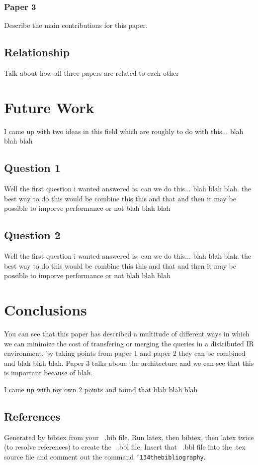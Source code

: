 \documentclass{acm_proc_article-sp}
\begin{document}
\subsubsection{Paper 3}
Describe the main contributions for this paper.

\subsection{Relationship}
Talk about how all three papers are related to each other

\section{Future Work}
I came up with two ideas in this field which are roughly to do with this... blah blah blah

\subsection{Question 1}
Well the first question i wanted answered is, can we do this... blah blah blah. the best way to do this would be combine this this and that and then it may be possible to imporve performance or not blah blah blah

\subsection{Question 2}
Well the first question i wanted answered is, can we do this... blah blah blah. the best way to do this would be combine this this and that and then it may be possible to imporve performance or not blah blah blah

\section{Conclusions}
You can see that this paper has described a multitude of different ways in which we can minimize the cost of transfering or merging the queries in a distributed IR environment. by taking points from paper 1 and paper 2 they can be combined and blah blah blah. Paper 3 talks aboue the architecture and we can see that this is important because of blah.

I came up with my own 2 points and found that blah blah blah


 

\subsection{References}
Generated by bibtex from your ~.bib file.  Run latex,
then bibtex, then latex twice (to resolve references)
to create the ~.bbl file.  Insert that ~.bbl file into
the .tex source file and comment out
the command \texttt{{\char'134}thebibliography}.
\balancecolumns
\end{document}
